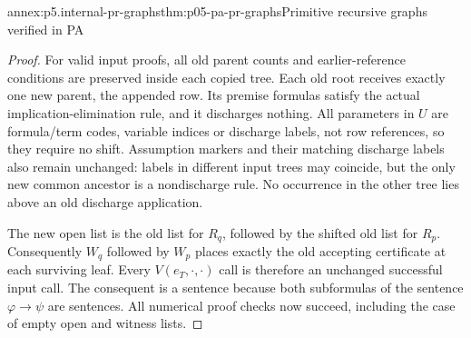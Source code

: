 \begin{annexitem}{annex:p5.internal-pr-graphs}{thm:p05-pa-pr-graphs}{Primitive recursive graphs verified in PA}
\begin{proof}
For valid input proofs, all old parent counts and earlier-reference conditions
are preserved inside each copied tree.  Each old root receives exactly one
new parent, the appended row.  Its premise formulas satisfy the actual
implication-elimination rule, and it discharges nothing.  All parameters
in \(U\) are formula/term codes, variable indices or discharge labels,
not row references, so they require no shift.  Assumption markers and their
matching discharge labels also remain unchanged: labels in different input
trees may coincide, but the only new common ancestor is a nondischarge rule.
No occurrence in the other tree lies above an old discharge application.

The new open list is the old list for \(R_q\), followed by the shifted
old list for \(R_p\).  Consequently \(W_q\) followed by \(W_p\)
places exactly the old accepting certificate at each surviving leaf.
Every \(V(e_T,\cdot,\cdot)\) call is therefore an unchanged successful
input call.  The consequent is a sentence because both subformulas of the
sentence \(\varphi\to\psi\) are sentences.  All numerical proof checks
now succeed, including the case of empty open and witness lists.
\end{proof}
\end{annexitem}

